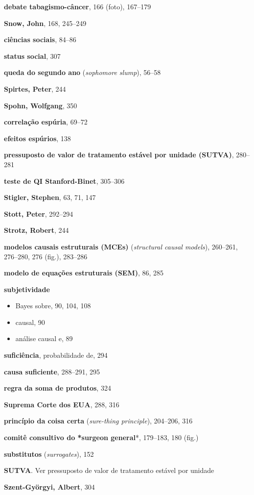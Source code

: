\documentclass[11pt,a5paper,twoside]{book}
\begin{document}
\textbf{debate tabagismo-câncer}, 166 (foto), 167–179

\textbf{Snow, John}, 168, 245–249

\textbf{ciências sociais}, 84–86

\textbf{status social}, 307

\textbf{queda do segundo ano} (\textit{sophomore slump}), 56–58

\textbf{Spirtes, Peter}, 244

\textbf{Spohn, Wolfgang}, 350

\textbf{correlação espúria}, 69–72

\textbf{efeitos espúrios}, 138

\textbf{pressuposto de valor de tratamento estável por unidade (SUTVA)}, 280–281

\textbf{teste de QI Stanford-Binet}, 305–306

\textbf{Stigler, Stephen}, 63, 71, 147

\textbf{Stott, Peter}, 292–294

\textbf{Strotz, Robert}, 244

\textbf{modelos causais estruturais (MCEs)} (\textit{structural causal models}), 260–261, 276–280, 276 (fig.), 283–286

\textbf{modelo de equações estruturais (SEM)}, 86, 285

\textbf{subjetividade}

\begin{itemize}
\item Bayes sobre, 90, 104, 108
\item causal, 90
\item análise causal e, 89
\end{itemize}
\textbf{suficiência}, probabilidade de, 294

\textbf{causa suficiente}, 288–291, 295

\textbf{regra da soma de produtos}, 324

\textbf{Suprema Corte dos EUA}, 288, 316

\textbf{princípio da coisa certa} (\textit{sure-thing principle}), 204–206, 316

\textbf{comitê consultivo do *surgeon general}*, 179–183, 180 (fig.)

\textbf{substitutos} (\textit{surrogates}), 152

\textbf{SUTVA}. Ver pressuposto de valor de tratamento estável por unidade

\textbf{Szent-Györgyi, Albert}, 304
\end{document}
